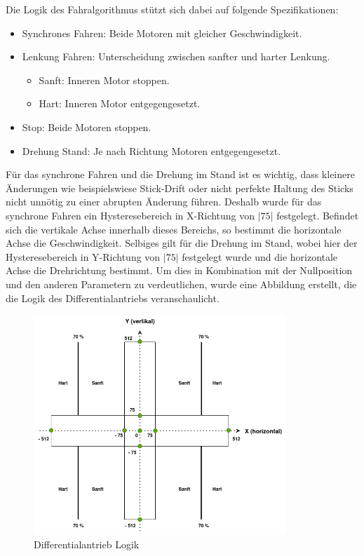 Die Logik des Fahralgorithmus stützt sich dabei auf folgende Spezifikationen:

\begin{itemize}
    \item Synchrones Fahren: Beide Motoren mit gleicher Geschwindigkeit.
    \item Lenkung Fahren: Unterscheidung zwischen sanfter und harter Lenkung.
    \begin{itemize}
        \item Sanft: Inneren Motor stoppen.
        \item Hart: Inneren Motor entgegengesetzt.
    \end{itemize}
    \item Stop: Beide Motoren stoppen.
    \item Drehung Stand: Je nach Richtung Motoren entgegengesetzt.
\end{itemize}

Für das synchrone Fahren und die Drehung im Stand ist es wichtig, dass kleinere Änderungen wie beispielswiese Stick-Drift oder nicht perfekte Haltung des Sticks nicht unnötig zu einer abrupten Änderung führen. Deshalb wurde für das synchrone Fahren ein Hysteresebereich in X-Richtung von $|75|$ festgelegt. Befindet sich die vertikale Achse innerhalb dieses Bereichs, so bestimmt die horizontale Achse die Geschwindigkeit. Selbiges gilt für die Drehung im Stand, wobei hier der Hysteresebereich in Y-Richtung von $|75|$ festgelegt wurde und die horizontale Achse die Drehrichtung bestimmt. Um dies in Kombination mit der Nullposition und den anderen Parametern zu verdeutlichen, wurde eine Abbildung erstellt, die die Logik des Differentialantriebs veranschaulicht. \newline

\begin{figure}[H]
    \centering
    \includegraphics[width=0.85\textwidth]{images/diff_drive_logic.png}
    \caption{Differentialantrieb Logik}
    \label{fig:diff_drive_logic}
\end{figure}

